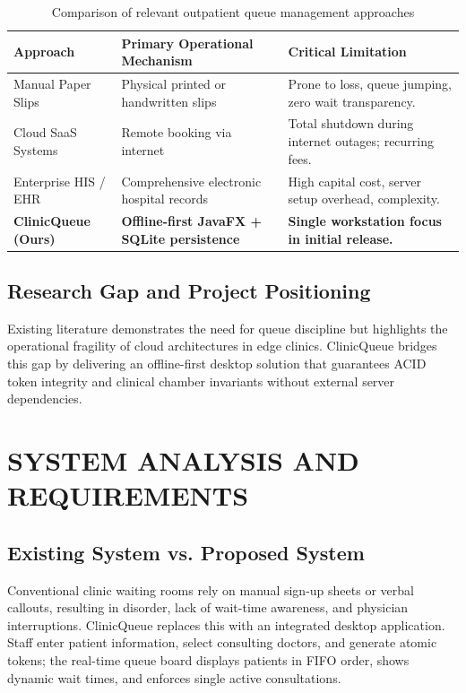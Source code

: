 \documentclass[12pt,a4paper,oneside]{report}
\begin{document}
\begin{table}[H]
\centering
\small
\begin{tabularx}{\textwidth}{p{3.2cm} X X}
\toprule
\textbf{Approach} & \textbf{Primary Operational Mechanism} & \textbf{Critical Limitation} \\
\midrule
Manual Paper Slips & Physical printed or handwritten slips & Prone to loss, queue jumping, zero wait transparency. \\
Cloud SaaS Systems & Remote booking via internet & Total shutdown during internet outages; recurring fees. \\
Enterprise HIS / EHR & Comprehensive electronic hospital records & High capital cost, server setup overhead, complexity. \\
\textbf{ClinicQueue (Ours)} & \textbf{Offline-first JavaFX + SQLite persistence} & \textbf{Single workstation focus in initial release.} \\
\bottomrule
\end{tabularx}
\caption{Comparison of relevant outpatient queue management approaches}
\end{table}

\section{Research Gap and Project Positioning}
Existing literature demonstrates the need for queue discipline but highlights the operational fragility of cloud architectures in edge clinics. ClinicQueue bridges this gap by delivering an offline-first desktop solution that guarantees ACID token integrity and clinical chamber invariants without external server dependencies.

\chapter{SYSTEM ANALYSIS AND REQUIREMENTS}

\section{Existing System vs. Proposed System}
Conventional clinic waiting rooms rely on manual sign-up sheets or verbal callouts, resulting in disorder, lack of wait-time awareness, and physician interruptions. ClinicQueue replaces this with an integrated desktop application. Staff enter patient information, select consulting doctors, and generate atomic tokens; the real-time queue board displays patients in FIFO order, shows dynamic wait times, and enforces single active consultations.
\end{document}

